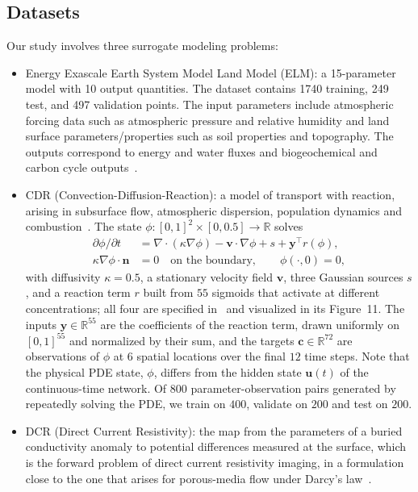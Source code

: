 \documentclass[pdflatex,sn-mathphys-num]{sn-jnl}%
\newcommand{\bfu}{\mathbf{u}}
\newcommand{\bfc}{\mathbf{c}}
\newcommand{\bfy}{\mathbf{y}}
\theoremstyle{thmstyleone}%
\theoremstyle{thmstyletwo}%
\theoremstyle{thmstylethree}%
\begin{document}
\subsection{Datasets}\label{subsect:data}
 
Our study involves three surrogate modeling problems:
\begin{itemize}
    \item Energy Exascale Earth System Model Land Model (ELM): a 15-parameter model with 10 output quantities. The dataset contains 1740 training, 249 test, and 497 validation points.
    The input parameters include atmospheric forcing data such as atmospheric pressure and relative humidity and land surface parameters/properties such as soil properties and topography.
    The outputs correspond to energy and water fluxes and biogeochemical and carbon cycle outputs~\cite{yuan2023evaluation}.
    \item CDR (Convection-Diffusion-Reaction): a model of transport with reaction, arising in subsurface flow, atmospheric dispersion, population dynamics and combustion~\cite{VarPro}.
    The state $\phi:[0,1]^2\times[0,0.5]\to\mathbb{R}$ solves
    \begin{align*}
     \partial\phi/\partial t &= \nabla \cdot (\kappa \nabla \phi) - \mathbf{v} \cdot \nabla \phi + s + \bfy^\top r(\phi), \\
     \kappa \nabla \phi \cdot \mathbf{n} &= 0 \quad \text{on the boundary}, \qquad \phi(\cdot,0) = 0,
    \end{align*}
    with diffusivity $\kappa=0.5$, a stationary velocity field $\mathbf{v}$, three Gaussian sources $s$, and a reaction term $r$ built from $55$ sigmoids that activate at different concentrations; all four are specified in~\cite[Appendix C]{VarPro} and visualized in its Figure~11.
    The inputs $\bfy\in\mathbb{R}^{55}$ are the coefficients of the reaction term, drawn uniformly on $[0,1]^{55}$ and normalized by their sum, and the targets $\bfc\in\mathbb{R}^{72}$ are observations of $\phi$ at $6$ spatial locations over the final $12$ time steps.
    Note that the physical PDE state, $\phi$, differs from the hidden state $\bfu(t)$ of the continuous-time network.
    Of $800$ parameter-observation pairs generated by repeatedly solving the PDE, we train on $400$, validate on $200$ and test on $200$.
    \item DCR (Direct Current Resistivity): the map from the parameters of a buried conductivity anomaly to potential differences measured at the surface, which is the forward problem of direct current resistivity imaging, in a formulation close to the one that arises for porous-media flow under Darcy's law~\cite{VarPro}.

\end{itemize}
\end{document}

